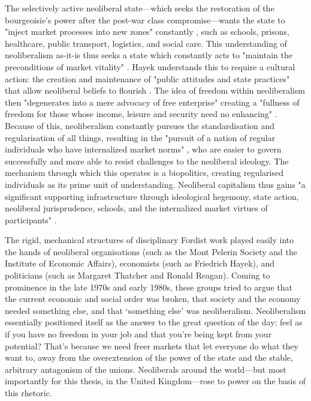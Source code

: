 The selectively active neoliberal state—which seeks the restoration of the bourgeoisie's power after the post-war class compromise—wants the state to "inject market processes into new zones" constantly \citep[p. 21]{connolly_fragility_2013}, such as schools, prisons, healthcare, public transport, logistics, and social care. This understanding of neoliberalism as-it-is thus seeks a state which constantly acts to "maintain the preconditions of market vitality" \citep[p. 60]{connolly_fragility_2013}. Hayek understands this to require a cultural action: the creation and maintenance of "public attitudes and state practices" that allow neoliberal beliefs to flourish \citep[p. 57]{connolly_fragility_2013}. The idea of freedom within neoliberalism then "degenerates into a mere advocacy of free enterprise" creating a "fullness of freedom for those whose income, leisure and security need no enhancing" \citep[p. 265]{polanyi_great_1944}. Because of this, neoliberalism constantly pursues the standardisation and regularisation of all things, resulting in the "pursuit of a nation of regular individuals who have internalized market norms" \citep[p. 53]{connolly_fragility_2013}, who are easier to govern successfully and more able to resist challenges to the neoliberal ideology. The mechanism through which this operates is a biopolitics, creating regularised individuals as its prime unit of understanding. Neoliberal capitalism thus gains "a significant supporting infrastructure through ideological hegemony, state action, neoliberal jurisprudence, schools, and the internalized market virtues of participants" \citep[p. 62]{connolly_fragility_2013}.

The rigid, mechanical structures of disciplinary Fordist work played easily into the hands of neoliberal organisations (such as the Mont Pelerin Society and the Institute of Economic Affairs), economists (such as Friedrich Hayek), and politicians (such as Margaret Thatcher and Ronald Reagan). Coming to prominence in the late 1970s and early 1980s, these groups tried to argue that the current economic and social order was broken, that society and the economy needed something else, and that `something else' was neoliberalism. Neoliberalism essentially positioned itself as the answer to the great question of the day: feel as if you have no freedom in your job and that you're being kept from your potential? That's because we need freer markets that let everyone do what they want to, away from the overextension of the power of the state and the stable, arbitrary antagonism of the unions. Neoliberals around the world—but most importantly for this thesis, in the United Kingdom—rose to power on the basis of this rhetoric.

